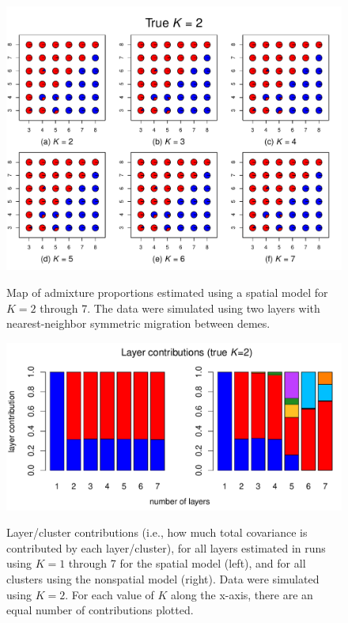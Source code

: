 \documentclass[10pt,letterpaper]{article}
\begin{document}
\begin{figure}
	\centering
		{\includegraphics[width=\textwidth]{figs/sims/simK2_sp_pies.pdf}}
	\caption{
	Map of admixture proportions estimated using a spatial model for $K=2$ through 7.
	The data were simulated using two layers with nearest-neighbor symmetric migration between demes.
    }\label{simK2_sp_pies}
\end{figure}
\clearpage

\begin{figure}
	\centering
		{\includegraphics[width=\textwidth]{figs/sims/simK2_laycon_barplots.pdf}}
		\caption{
			Layer/cluster contributions (i.e., how much total covariance is contributed by each layer/cluster), 
			for all layers estimated in runs using $K = 1$ through 7 
			for the spatial model (left), 
			and for all clusters using the nonspatial model (right).
			Data were simulated using $K=2$.
			For each value of $K$ along the x-axis, there are an equal number of contributions plotted.
		}\label{simK2_laycon}
\end{figure}
\clearpage
\end{document}
